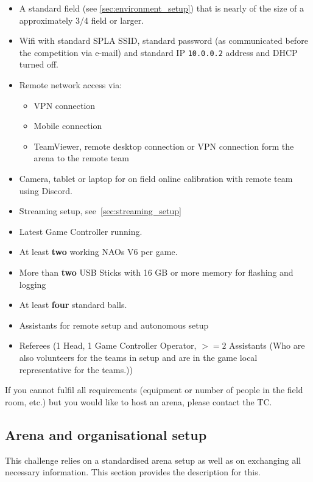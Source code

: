 \begin{itemize}
    \item A standard field (see \ref{sec:environment_setup}) that is nearly of the size of a approximately 3/4 field or larger.
	\item Wifi with standard SPL\textunderscore A SSID, standard password (as communicated before the competition via e-mail) and standard IP \texttt{10.0.0.2} address and DHCP turned off.
    \item Remote network access via:
    \begin{itemize}
        \item VPN connection
        \item Mobile connection
        \item TeamViewer, remote desktop connection or VPN connection form the arena to the remote team
    \end{itemize}
    \item Camera, tablet or laptop for on field online calibration with remote team using Discord.
    \item Streaming setup, see~\ref{sec:streaming_setup}
	\item Latest Game Controller running.
    \item At least \textbf{two} working NAOs V6 per game.
    \item More than \textbf{two} USB Sticks with 16 GB or more memory for flashing and logging 
    \item At least \textbf{four} standard balls.
    \item Assistants for remote setup and autonomous setup
    \item Referees (1 Head, 1 Game Controller Operator, $>= 2$ Assistants (Who are also volunteers for the teams in setup and are in the game local representative for the teams.))
\end{itemize}

If you cannot fulfil all requirements (equipment or number of people in the field room, etc.) but you would like to host an arena, please contact the TC.

\subsection{Arena and organisational setup}
This challenge relies on a standardised arena setup as well as on exchanging all necessary information. This section provides the description for this.

